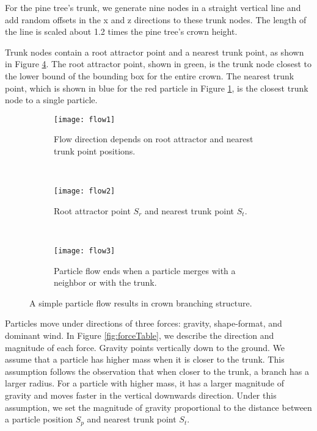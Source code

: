 For the pine tree's trunk, we generate nine nodes in a straight vertical line and add random offsets in the x and z directions to these trunk nodes. The length of the line is scaled about 1.2 times the pine tree's crown height.

Trunk nodes contain a root attractor point and a nearest trunk point, as shown in Figure \ref{fig:flow}. The root attractor point, shown in green, is the trunk node closest to the lower bound of the bounding box for the entire crown. The nearest trunk point, which is shown in blue for the red particle in Figure \ref{fig:flowsubfig1}, is the closest trunk node to a single particle.

\begin{figure}
\centering
        \begin{subfigure}[b]{0.2\textwidth}
                \centering
                \texttt{[image: flow1]}
                \caption{Flow direction depends on root attractor and nearest trunk point positions.}
                \label{fig:flowsubfig1}
        \end{subfigure}
        ~
        \begin{subfigure}[b]{0.3\textwidth}
                \centering
                \texttt{[image: flow2]}
                \caption{Root attractor point $S_r$ and nearest trunk point $S_t$.}
                \label{fig:flowsubfig2}
        \end{subfigure} 
        ~
        \begin{subfigure}[b]{0.3\textwidth}
                \centering
                \texttt{[image: flow3]}
                \caption{Particle flow ends when a particle merges with a neighbor or with the trunk.}
                \label{fig:flowsubfig3}
        \end{subfigure}             
\caption{A simple particle flow results in crown branching structure.}
\label{fig:flow}
\end{figure}

Particles move under directions of three forces: gravity, shape-format, and dominant wind. In Figure \ref{fig:forceTable}, we describe the direction and magnitude of each force. Gravity points vertically down to the ground. We assume that a particle has higher mass when it is closer to the trunk. This assumption follows the observation that when closer to the trunk, a branch has a larger radius. For a particle with higher mass, it has a larger magnitude of gravity and moves faster in the vertical downwards direction. Under this assumption, we set the magnitude of gravity proportional to the distance between a particle position $S_p$ and nearest trunk point $S_t$. 

